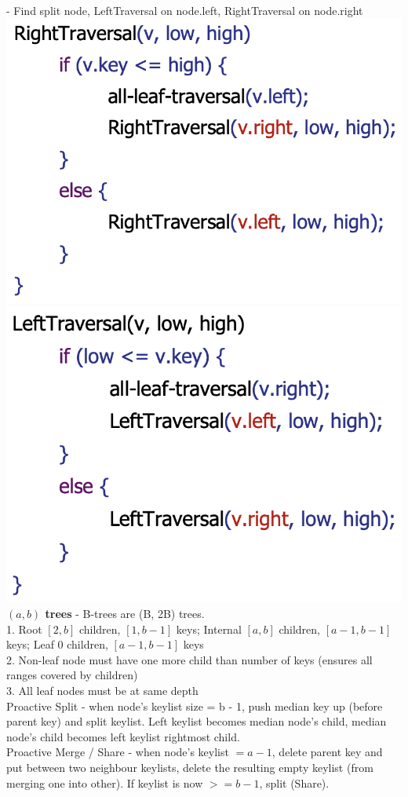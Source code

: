 \documentclass[10pt, a4paper]{article}
\begin{document}
\begin{multicols*}{3}
		- Find split node, LeftTraversal on node.left, RightTraversal on node.right\\
		\includegraphics[scale=.25]{./assets/RightTraversal} \includegraphics[scale=.25]{./assets/LeftTraversal}\\
		\textbf{$(a, b)$ trees} - B-trees are (B, 2B) trees.\\
		1. Root $[2, b]$ children, $[1, b-1]$ keys; Internal $[a, b]$ children, $[a - 1, b - 1]$ keys; Leaf 0 children, $[a - 1, b - 1]$ keys\\ 
		2. Non-leaf node must have one more child than number of keys (ensures all ranges covered by children)\\
		3. All leaf nodes must be at same depth\\
		Proactive Split - when node's keylist size = b - 1, push median key up (before parent key) and split keylist. Left keylist becomes median node's child, median node's child becomes left keylist rightmost child.\\
		Proactive Merge / Share - when node's keylist $= a - 1$, delete parent key and put between two neighbour keylists, delete the resulting empty keylist (from merging one into other). If keylist is now $>= b - 1$, split (Share).\\
	

\end{multicols*}
\end{document}
